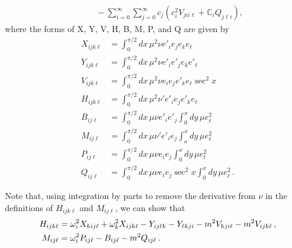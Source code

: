 \documentclass[../PhD.tex]{subfiles}
\begin{document}
\begin{subappendices}
\begin{align}
& \qquad - \sum_{i=0}^\infty \sum_{j=0}^\infty c_j \left( c_i^2 V_{jii\ell} + \mathbb C_i Q_{j\ell i} \right) ,
\end{align}
where the forms of X, Y, V, H, B, M, P, and Q are given by
\begin{align}
X_{ijk\ell} &= \int^{\pi/2}_0 dx \, \mu^2 \nu e'_i e_j e_k e_\ell \\
Y_{ijk\ell} &= \int^{\pi/2}_0 dx \, \mu^2 \nu e'_i e'_j e_k e'_\ell \\ 
V_{ijk\ell} &= \int^{\pi/2}_0 dx \, \mu^2 \nu e_i e_j e'_k e_\ell \sec^2 x \\
H_{ijk\ell} &= \int^{\pi/2}_0 dx \, \mu^2 \nu' e'_i e_j e'_k e_\ell \\
B_{ij\ell} &= \int^{\pi/2}_0 dx \, \mu \nu e'_i e'_j \int^x_0 dy \, \mu e^2_\ell \\
M_{ij\ell} &= \int^{\pi/2}_0 dx \, \mu \nu' e'_i e_j \int^x_o dy \, \mu e_\ell^2 \\
P_{ij\ell} &= \int^{\pi/2}_0 dx \, \mu \nu e_i e_j \int^x_0 dy \, \mu e^2_\ell \\
Q_{ij\ell} &= \int^{\pi/2}_0 dx \, \mu \nu e_i e_j \sec^2 x \int^x_0 dy \, \mu e^2_\ell \, .
\end{align}

Note that, using integration by parts to remove the derivative from $\nu$ in the definitions of $H_{ijk\ell}$ and $M_{ij\ell}$, we can show that
\begin{align}
H_{ijk\ell} &= \omega_i^2 X_{kij\ell} + \omega_k^2 X_{ijk\ell} - Y_{ij\ell k}  - Y_{\ell kji}   - m^2 V_{kji\ell} -m^2 V_{ijk\ell} \, , \\
M_{ij\ell} &= \omega_i^2 P_{ij\ell} - B_{ij\ell} -m^2 Q_{ij\ell} \, .
\end{align}


\end{subappendices}
\end{document}
